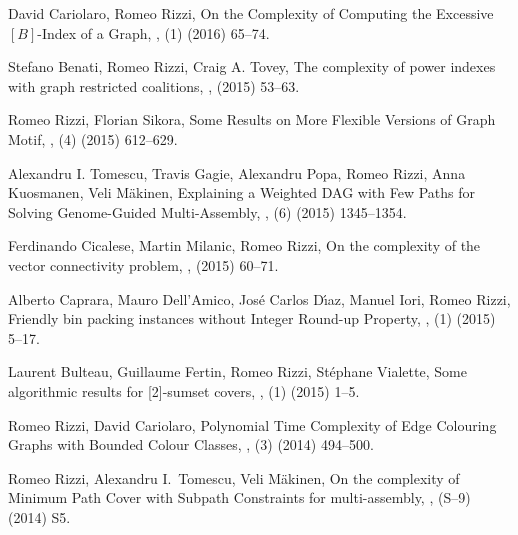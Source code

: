 \begin{etaremune}
  \item {\sc David Cariolaro, Romeo Rizzi},
   \newblock On the Complexity of Computing the Excessive $[B]$-Index of a Graph,
   ,
   (1) (2016) 65--74.

  \item {\sc Stefano Benati, Romeo Rizzi, Craig A. Tovey},
   \newblock The complexity of power indexes with graph restricted coalitions,
   ,
    (2015) 53--63.

  \item {\sc Romeo Rizzi, Florian Sikora},
   \newblock Some Results on More Flexible Versions of Graph Motif,
   ,
   (4) (2015) 612--629.

  \item {\sc Alexandru I. Tomescu, Travis Gagie, Alexandru Popa, Romeo Rizzi, Anna Kuosmanen, Veli Mäkinen},
   \newblock Explaining a Weighted DAG with Few Paths for Solving Genome-Guided Multi-Assembly,
   ,
   (6) (2015) 1345--1354.

  \item {\sc Ferdinando Cicalese, Martin Milanic, Romeo Rizzi},
   \newblock On the complexity of the vector connectivity problem,
   ,
    (2015) 60--71.        

  \item {\sc Alberto Caprara, Mauro Dell'Amico, Jos\'e Carlos D\'\i{}az, Manuel Iori, Romeo Rizzi},
   \newblock Friendly bin packing instances without Integer Round-up Property,
   ,
   (1) (2015) 5--17.

  \item {\sc Laurent Bulteau, Guillaume Fertin, Romeo Rizzi, St\'ephane Vialette},
   \newblock  Some algorithmic results for [2]-sumset covers,
   ,
   (1) (2015) 1--5.

  \item {\sc Romeo Rizzi, David Cariolaro},
   \newblock  Polynomial Time Complexity of Edge Colouring Graphs with Bounded Colour Classes,
   ,
   (3) (2014) 494--500.

  \item {\sc Romeo Rizzi, Alexandru I.~Tomescu, Veli M\"akinen},
   \newblock  On the complexity of Minimum Path Cover with Subpath Constraints for multi-assembly,
   ,
   (S--9) (2014) S5.


\end{etaremune}
